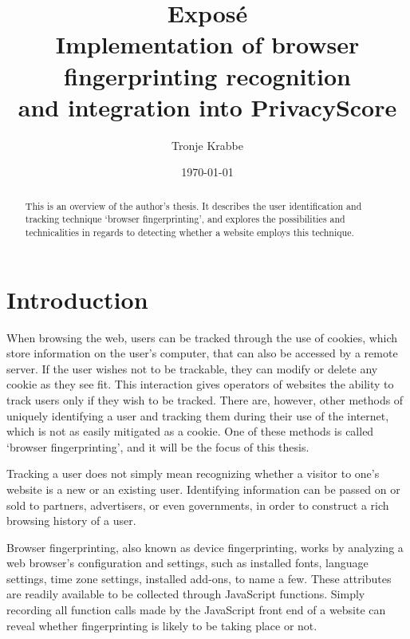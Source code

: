 \documentclass[a4paper, 12pt]{scrreprt}
\title{
    Exposé\\
    \medskip
    \large Implementation of browser fingerprinting recognition \\
    and integration into PrivacyScore
}
\author{Tronje Krabbe}
\date{\today}
\begin{document}
\hypersetup{hidelinks}

\maketitle

\begin{abstract}
    \doublespacing
    This is an overview of the author's thesis. It describes the user identification and tracking
    technique `browser fingerprinting',
    and explores the possibilities and technicalities in regards to detecting whether a website employs
    this technique.
\end{abstract}

\tableofcontents

\chapter{Introduction}
When browsing the web, users can be tracked through the use of cookies, which store information on the user's computer,
that can also be accessed by a remote server.
If the user wishes not to be trackable, they can modify or delete any cookie as they see fit. This interaction gives
operators of websites the ability to track users only if they wish to be tracked.
There are, however, other methods of uniquely identifying a user and tracking them during their use of the internet,
which is not as easily mitigated as a cookie.\cite{am_i_unique} One of these methods is called `browser fingerprinting',
and it will be the focus of this thesis.

Tracking a user does not simply mean recognizing whether a visitor to one's website is a new or an existing user.
Identifying information can be passed on or sold to partners, advertisers, or even governments, in order to
construct a rich browsing history of a user.

Browser fingerprinting, also known as device fingerprinting, works by analyzing a web browser's configuration and settings,
such as installed fonts, language settings, time zone settings, installed add-ons, to name a few.
These attributes are readily available to be collected through JavaScript functions. Simply recording
all function calls made by the JavaScript front end of a website can reveal whether fingerprinting is likely to
be taking place or not.\cite{faiz2014browser}\cite{panopticlick}
\end{document}
